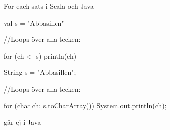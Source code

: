 \begin{Slide}{For-each-sats i Scala och Java}
\begin{multicols}{2}
\begin{CodeSmall}[basicstyle=\ttfamily\SlideFontSize{6}{8}]
val s = "Abbasillen"

//Loopa över alla tecken:

for (ch <- s) {
  println(ch)
}
\end{CodeSmall}

\columnbreak

\begin{CodeSmall}[language=Java,basicstyle=\ttfamily\SlideFontSize{6}{8}]
String s = "Abbasillen";

//Loopa över alla tecken:

for (char ch: s.toCharArray()) {
  System.out.println(ch);
}
\end{CodeSmall}
\end{multicols}

\pause{} går ej i Java
\end{Slide}





